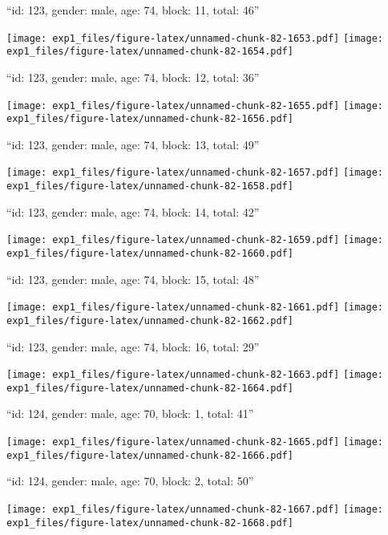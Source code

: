 \documentclass[11pt,,]{article}
\begin{document}
\newpage
[1] 

``id: 123, gender: male, age: 74, block: 11, total: 46''

\texttt{[image: exp1\_files/figure-latex/unnamed-chunk-82-1653.pdf]}
\texttt{[image: exp1\_files/figure-latex/unnamed-chunk-82-1654.pdf]}

\newpage
[1] 

``id: 123, gender: male, age: 74, block: 12, total: 36''

\texttt{[image: exp1\_files/figure-latex/unnamed-chunk-82-1655.pdf]}
\texttt{[image: exp1\_files/figure-latex/unnamed-chunk-82-1656.pdf]}

\newpage
[1] 

``id: 123, gender: male, age: 74, block: 13, total: 49''

\texttt{[image: exp1\_files/figure-latex/unnamed-chunk-82-1657.pdf]}
\texttt{[image: exp1\_files/figure-latex/unnamed-chunk-82-1658.pdf]}

\newpage
[1] 

``id: 123, gender: male, age: 74, block: 14, total: 42''

\texttt{[image: exp1\_files/figure-latex/unnamed-chunk-82-1659.pdf]}
\texttt{[image: exp1\_files/figure-latex/unnamed-chunk-82-1660.pdf]}

\newpage
[1] 

``id: 123, gender: male, age: 74, block: 15, total: 48''

\texttt{[image: exp1\_files/figure-latex/unnamed-chunk-82-1661.pdf]}
\texttt{[image: exp1\_files/figure-latex/unnamed-chunk-82-1662.pdf]}

\newpage
[1] 

``id: 123, gender: male, age: 74, block: 16, total: 29''

\texttt{[image: exp1\_files/figure-latex/unnamed-chunk-82-1663.pdf]}
\texttt{[image: exp1\_files/figure-latex/unnamed-chunk-82-1664.pdf]}

\newpage
[1] 

``id: 124, gender: male, age: 70, block: 1, total: 41''

\texttt{[image: exp1\_files/figure-latex/unnamed-chunk-82-1665.pdf]}
\texttt{[image: exp1\_files/figure-latex/unnamed-chunk-82-1666.pdf]}

\newpage
[1] 

``id: 124, gender: male, age: 70, block: 2, total: 50''

\texttt{[image: exp1\_files/figure-latex/unnamed-chunk-82-1667.pdf]}
\texttt{[image: exp1\_files/figure-latex/unnamed-chunk-82-1668.pdf]}
\end{document}
